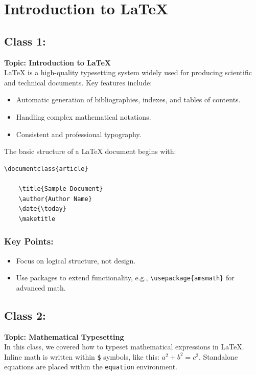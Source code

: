 \section{Introduction to \LaTeX}
\subsection{Class 1:}
\textbf{Topic: Introduction to \LaTeX} \\

\LaTeX{} is a high-quality typesetting system widely used for producing scientific and technical documents. Key features include:
\begin{itemize}
    \item Automatic generation of bibliographies, indexes, and tables of contents.
    \item Handling complex mathematical notations.
    \item Consistent and professional typography.
\end{itemize}

The basic structure of a \LaTeX{} document begins with:
\begin{verbatim}
\documentclass{article}

    \title{Sample Document}
    \author{Author Name}
    \date{\today}
    \maketitle

\end{verbatim}

\subsubsection{Key Points:}
\begin{itemize}
    \item Focus on logical structure, not design.
    \item Use packages to extend functionality, e.g., \verb|\usepackage{amsmath}| for advanced math.
\end{itemize}

\subsection{Class 2:}
\textbf{Topic: Mathematical Typesetting} \\

In this class, we covered how to typeset mathematical expressions in \LaTeX{}. Inline math is written within \verb|$| symbols, like this: $a^2 + b^2 = c^2$. Standalone equations are placed within the \verb|equation| environment.

